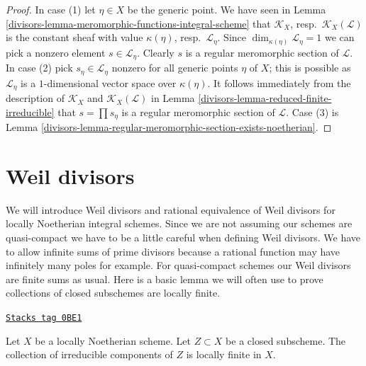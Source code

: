 \begin{proof}

In case (1) let $\eta \in X$ be the generic point. We have seen in
Lemma \ref{divisors-lemma-meromorphic-functions-integral-scheme}
that $\mathcal{K}_X$, resp.\ $\mathcal{K}_X(\mathcal{L})$
is the constant sheaf with value
$\kappa(\eta)$, resp.\ $\mathcal{L}_\eta$.
Since $\dim_{\kappa(\eta)} \mathcal{L}_\eta = 1$
we can pick a nonzero element $s \in \mathcal{L}_\eta$.
Clearly $s$ is a regular meromorphic section of $\mathcal{L}$.
In case (2) pick $s_\eta \in \mathcal{L}_\eta$ nonzero
for all generic points $\eta$ of $X$; this is possible
as $\mathcal{L}_\eta$ is a $1$-dimensional vector space
over $\kappa(\eta)$.
It follows immediately from the description of
$\mathcal{K}_X$ and $\mathcal{K}_X(\mathcal{L})$
in Lemma \ref{divisors-lemma-reduced-finite-irreducible}
that $s = \prod s_\eta$ is a regular meromorphic section of $\mathcal{L}$.
Case (3) is Lemma \ref{divisors-lemma-regular-meromorphic-section-exists-noetherian}.
\end{proof}

\section{Weil divisors}
\label{divisors-section-Weil-divisors}
We will introduce Weil divisors and rational equivalence of Weil
divisors for locally Noetherian integral schemes.
Since we are not assuming our schemes are quasi-compact we have
to be a little careful when defining Weil divisors. We have to allow
infinite sums of prime divisors because a rational function may have
infinitely many poles for example. For quasi-compact schemes our
Weil divisors are finite sums as usual. Here is a basic lemma we will
often use to prove collections of closed subschemes are locally finite.

\begin{lemma}
\label{divisors-lemma-components-locally-finite}
\href{https://stacks.math.columbia.edu/tag/0BE1}{\texttt{Stacks tag 0BE1}}

Let $X$ be a locally Noetherian scheme. Let $Z \subset X$ be a closed
subscheme. The collection of irreducible components of $Z$
is locally finite in $X$.
\end{lemma}

